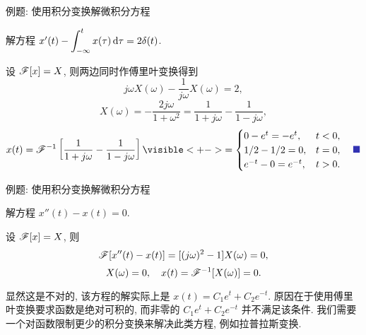 \begin{frame}{例题: 使用积分变换解微积分方程}
\beqskip{0pt}
\begin{example}
解方程 $x'(t)-\displaystyle\int_{-\infty}^t x(\tau)\,\mathrm{d} \tau=2\delta(t)$.
\end{example}
\begin{solutions}
设 $\mathscr{F}[x]=X$, 则两边同时作傅里叶变换得到
\onslide<+->
\[j\omega X(\omega)-\frac1{j\omega}X(\omega)=2,\]
\onslide<+->
\[X(\omega)=-\frac{2j\omega}{1+\omega^2}=\frac1{1+j\omega}-\frac1{1-j\omega},\]
\onslide<+->
\[x(t)=\msf^{-1}\left[\frac1{1+j\omega}-\frac1{1-j\omega}\right]
\visible<+->{=\begin{cases}
0-e^t=-e^t,&t<0,\\
1/2-1/2=0,&t=0,\\
e^{-t}-0=e^{-t},&t>0.
\end{cases}\mqed}\]
\end{solutions}
\vspace{-1pt}
\endgroup
\end{frame}


\begin{frame}{例题: 使用积分变换解微积分方程}
\beqskip{8pt}
\begin{example}
解方程 $x''(t)-x(t)=0$.
\end{example}
\begin{solutions}
设 $\mathscr{F}[x]=X$,
\onslide<+->
则
\[\mathscr{F}[x''(t)-x(t)]=[(j\omega)^2-1]X(\omega)=0,\]%
\onslide<+->
\vspace{-\baselineskip}
\[X(\omega)=0,\quad x(t)=\mathscr{F}^{-1}[X(\omega)]=0.\]
\end{solutions}
\onslide<+->
显然这是不对的, 该方程的解实际上是 $x(t)=C_1e^t+C_2e^{-t}$.
\onslide<+->
原因在于使用傅里叶变换要求函数是绝对可积的, 而非零的 $C_1e^t+C_2e^{-t}$ 并不满足该条件.
\onslide<+->
我们需要一个对函数限制更少的积分变换来解决此类方程, 例如拉普拉斯变换.
\endgroup
\end{frame}

